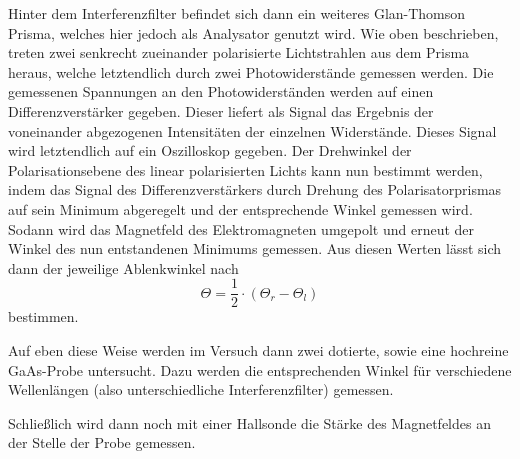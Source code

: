 Hinter dem Interferenzfilter befindet sich dann ein weiteres Glan-Thomson Prisma,
welches hier jedoch als Analysator genutzt wird. Wie oben beschrieben, treten zwei
senkrecht zueinander polarisierte Lichtstrahlen aus dem Prisma heraus, welche letztendlich
durch zwei Photowiderstände gemessen werden. Die gemessenen Spannungen an den Photowiderständen
werden auf einen Differenzverstärker gegeben. Dieser liefert als Signal das Ergebnis der voneinander
abgezogenen Intensitäten der einzelnen Widerstände. Dieses Signal wird letztendlich auf
ein Oszilloskop gegeben. Der Drehwinkel der Polarisationsebene des linear polarisierten Lichts
kann nun bestimmt werden, indem das Signal des Differenzverstärkers durch Drehung des
Polarisatorprismas auf sein Minimum abgeregelt und der entsprechende Winkel gemessen
wird. Sodann wird das Magnetfeld des Elektromagneten umgepolt und erneut der
Winkel des nun entstandenen Minimums gemessen. Aus diesen Werten lässt sich dann der
jeweilige Ablenkwinkel nach
\begin{equation}
  \Theta  = \frac{1}{2} \cdot (\Theta_r - \Theta_l)
\label{eqn:drehwinkel}
\end{equation}
bestimmen.

Auf eben diese Weise werden im Versuch dann zwei dotierte, sowie eine hochreine
GaAs-Probe untersucht. Dazu werden die entsprechenden Winkel für verschiedene
Wellenlängen (also unterschiedliche Interferenzfilter) gemessen.

Schließlich wird dann noch mit einer Hallsonde die Stärke des Magnetfeldes an der
Stelle der Probe gemessen.
